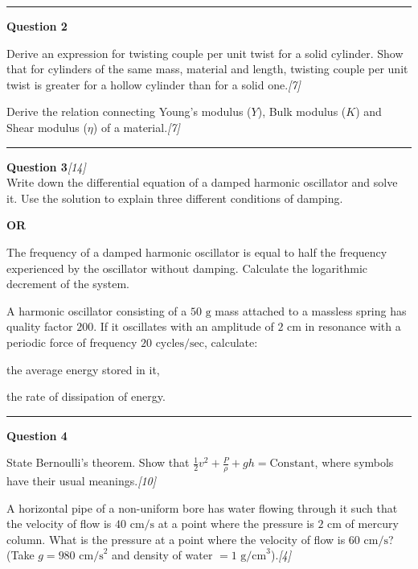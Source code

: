 \documentclass[11pt,a4paper]{article}
\newcommand{\pts}[1]{\hfill\textit{[#1]}}
\begin{document}
\medskip\rule{\linewidth}{0.2pt}\medskip

\noindent\textbf{Question 2}
\begin{parts}
  \item Derive an expression for twisting couple per unit twist for a solid cylinder. Show that for cylinders of the same mass, material and length, twisting couple per unit twist is greater for a hollow cylinder than for a solid one.\pts{7}
  \item Derive the relation connecting Young's modulus ($Y$), Bulk modulus ($K$) and Shear modulus ($\eta$) of a material.\pts{7}
\end{parts}

\medskip\rule{\linewidth}{0.2pt}\medskip

\noindent\textbf{Question 3}\pts{14} \\
Write down the differential equation of a damped harmonic oscillator and solve it. Use the solution to explain three different conditions of damping.

\begin{center}\textbf{OR}\end{center}

\begin{parts}
  \item The frequency of a damped harmonic oscillator is equal to half the frequency experienced by the oscillator without damping. Calculate the logarithmic decrement of the system.
  \item A harmonic oscillator consisting of a $50\text{ g}$ mass attached to a massless spring has quality factor $200$. If it oscillates with an amplitude of $2\text{ cm}$ in resonance with a periodic force of frequency $20\text{ cycles/sec}$, calculate:
  \begin{parts}[label=(\alph*)]
    \item the average energy stored in it,
    \item the rate of dissipation of energy.
  \end{parts}
\end{parts}

\medskip\rule{\linewidth}{0.2pt}\medskip

\noindent\textbf{Question 4}
\begin{parts}
  \item State Bernoulli's theorem. Show that $\frac{1}{2}v^2 + \frac{P}{\rho} + gh = \text{Constant}$, where symbols have their usual meanings.\pts{10}
  \item A horizontal pipe of a non-uniform bore has water flowing through it such that the velocity of flow is $40\text{ cm/s}$ at a point where the pressure is $2\text{ cm}$ of mercury column. What is the pressure at a point where the velocity of flow is $60\text{ cm/s}$? (Take $g = 980\text{ cm/s}^2$ and density of water $= 1\text{ g/cm}^3$).\pts{4}
\end{parts}
\end{document}
